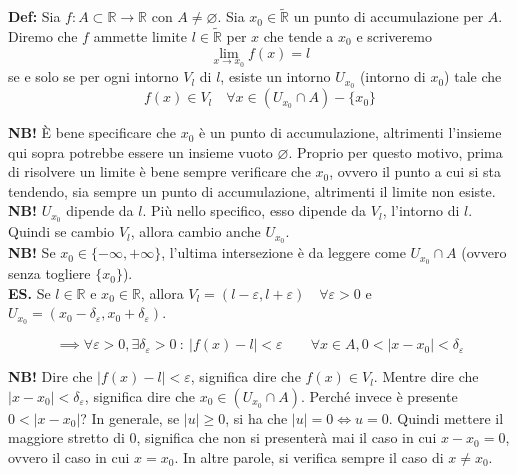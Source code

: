 \documentclass{article}
\begin{document}
\noindent\textbf{Def:} Sia $f: A \subset \mathbb{R} \xrightarrow{} \mathbb{R}$ con $A \neq \varnothing$. Sia $x_0 \in \widetilde{\mathbb{R}}$ un punto di accumulazione per $A$. Diremo che $f$ ammette limite $l \in \widetilde{\mathbb{R}}$ per $x$ che tende a $x_0$ e scriveremo  $$\lim_{x \to x_0} f(x) = l$$ se e solo se per ogni intorno $V_l$ di $l$, esiste un intorno $U_{x_0}$ (intorno di $x_0$) tale che $$f(x) \in V_l \quad \forall x \in (U_{x_0} \cap A) - \{x_0\}$$

\noindent\textbf{NB!} È bene specificare che $x_0$ è un punto di accumulazione, altrimenti l'insieme qui sopra potrebbe essere un insieme vuoto $\varnothing$. Proprio per questo motivo, prima di risolvere un limite è bene sempre verificare che $x_0$, ovvero il punto a cui si sta tendendo, sia sempre un punto di accumulazione, altrimenti il limite non esiste.\\

\noindent\textbf{NB!} $U_{x_0}$ dipende da $l$. Più nello specifico, esso dipende da $V_l$, l'intorno di $l$. Quindi se cambio $V_l$, allora cambio anche $U_{x_0}$. \\

\noindent\textbf{NB!} Se $x_0 \in \{-\infty, + \infty\}$, l'ultima intersezione è da leggere come $U_{x_0} \cap A$ (ovvero senza togliere $\{x_0\}$).\\

\noindent\textbf{ES.} Se $l \in \mathbb{R}$ e $x_0 \in \mathbb{R}$, allora $V_l = (l - \varepsilon, l + \varepsilon) \quad \forall \varepsilon > 0$ e $U_{x_0} = (x_0 - \delta_\varepsilon, x_0 + \delta_\varepsilon)$.

\begin{equation*}
    \implies \forall \varepsilon > 0, \exists \delta_\varepsilon > 0 \ : \ | f(x) - l | < \varepsilon \qquad \forall x \in A, 0 < | x - x_0 | < \delta_\varepsilon
\end{equation*}

\noindent\textbf{NB!} Dire che $| f(x) - l | < \varepsilon$, significa dire che $f(x) \in V_l$. Mentre dire che $| x - x_0 | < \delta_\varepsilon$, significa dire che $x_0 \in (U_{x_0} \cap A)$. Perché invece è presente $0 < | x - x_0 |$? In generale, se $|u| \geq 0$, si ha che $|u| = 0 \iff u = 0$. Quindi mettere il maggiore stretto di $0$, significa che non si presenterà mai il caso in cui $x - x_0 = 0$, ovvero il caso in cui $x = x_0$. In altre parole, si verifica sempre il caso di $x \neq x_0$.\\
\end{document}
